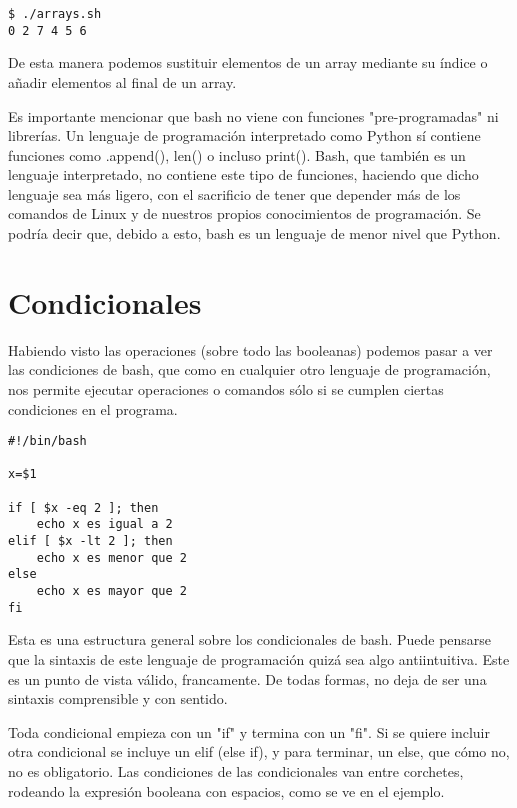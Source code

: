 \begin{tcolorbox-code}
\begin{lstlisting}
$ ./arrays.sh
0 2 7 4 5 6
\end{lstlisting}
\end{tcolorbox-code}

De esta manera podemos sustituir elementos de un array mediante su índice o añadir elementos al final de un array. 

Es importante mencionar que bash no viene con funciones "pre-programadas" ni librerías. Un lenguaje de programación interpretado como Python sí contiene funciones como .append(), len() o incluso print(). Bash, que también es un lenguaje interpretado, no contiene este tipo de funciones, haciendo que dicho lenguaje sea más ligero, con el sacrificio de tener que depender más de los comandos de Linux y de nuestros propios conocimientos de programación. Se podría decir que, debido a esto, bash es un lenguaje de menor nivel que Python.

\section{Condicionales}
Habiendo visto las operaciones (sobre todo las booleanas) podemos pasar a ver las condiciones de bash, que como en cualquier otro lenguaje de programación, nos permite ejecutar operaciones o comandos sólo si se cumplen ciertas condiciones en el programa.

\begin{tcolorbox-code}
\begin{lstlisting}
#!/bin/bash

x=$1

if [ $x -eq 2 ]; then
    echo x es igual a 2
elif [ $x -lt 2 ]; then
    echo x es menor que 2
else
    echo x es mayor que 2
fi
\end{lstlisting}
\end{tcolorbox-code}

Esta es una estructura general sobre los condicionales de bash. Puede pensarse que la sintaxis de este lenguaje de programación quizá sea algo antiintuitiva. Este es un punto de vista válido, francamente. De todas formas, no deja de ser una sintaxis comprensible y con sentido. 

Toda condicional empieza con un "if" y termina con un "fi". Si se quiere incluir otra condicional se incluye un elif (else if), y para terminar, un else, que cómo no, no es obligatorio. Las condiciones de las condicionales van entre corchetes, rodeando la expresión booleana con espacios, como se ve en el ejemplo.

